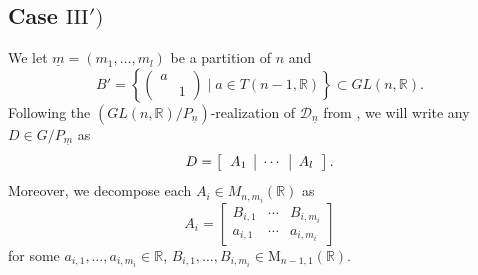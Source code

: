 \documentclass[pdftex]{sigma}
\numberwithin{equation}{section}
\newtheorem{Theorem}{Theorem}[section]
\theoremstyle{definition}
\newcommand{\rank}{\operatorname{rank}}
\newcommand{\R}{\mathbb{R}}
\newcommand{\D}{\mathcal{D}}
\newcommand{\T}{T}
\newcommand{\M}{\mathrm{M}}
\theoremstyle{plain}
\theoremstyle{plain}
\theoremstyle{plain}
\theoremstyle{plain}
\begin{document}
	
	











\subsection[Case III')]{Case $\mathrm{III}')$} \label{cas 3'}

We let $\underline m = (m_1,\dots,m_l)$ be a partition of $n$ and
\begin{equation*}
	B' = \left\{\begin{pmatrix}
	a & \\
	& 1
\end{pmatrix} \mid a \in \T(n-1,\R)\right\} \subset GL(n,\R).
\end{equation*}
Following the $(GL(n,\R)/P_{\underline n})$-realization of $\D_{\underline n}$ from , we will write any $D \in G/P_{\underline m}$ as
\begin{equation*}
	D = \left[\begin{tabular}{c|c|c}
	$A_1$ & $\cdots$ & $A_l$
\end{tabular}\right].
\end{equation*}
Moreover, we decompose each $A_i \in M_{n,m_i}(\R)$ as
\begin{equation*}
	A_i = \begin{bmatrix}
	B_{i,1} & \cdots & B_{i,m_i} \\
	a_{i,1} & \cdots & a_{i,m_i} 
\end{bmatrix}
\end{equation*} 
for some $a_{i,1},\dots,a_{i,m_i} \in \R$, $B_{i,1},\dots,B_{i,m_i} \in \M_{n-1,1}(\R)$.
\end{document}
